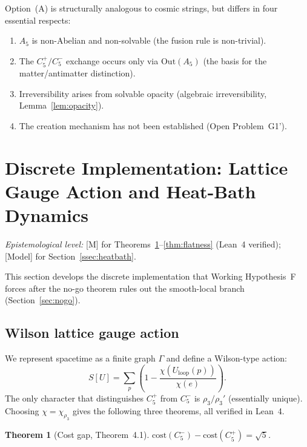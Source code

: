 \documentclass[sn-mathphys-num,Numbered]{sn-jnl}
\theoremstyle{thmstyleone}
\newtheorem{theorem}{Theorem}[section]
\theoremstyle{thmstylethree}
\theoremstyle{thmstyletwo}
\begin{document}
Option~(A) is structurally analogous to cosmic strings, but differs in
four essential respects:
\begin{enumerate}
  \item $A_5$ is non-Abelian and non-solvable (the fusion rule is
    non-trivial).
  \item The $C_5^+/C_5^-$ exchange occurs only via $\mathrm{Out}(A_5)$
    (the basis for the matter/antimatter distinction).
  \item Irreversibility arises from solvable opacity (algebraic
    irreversibility, Lemma~\ref{lem:opacity}).
  \item The creation mechanism has not been established (Open
    Problem~G1').
\end{enumerate}



\section{Discrete Implementation: Lattice Gauge Action and Heat-Bath Dynamics}
\label{sec:lattice}

\medskip
\noindent\textit{Epistemological level:} [M] for Theorems~\ref{thm:cost-gap}--\ref{thm:flatness} (Lean~4 verified); [Model] for Section~\ref{ssec:heatbath}.
\medskip

This section develops the discrete implementation that Working Hypothesis~F forces after the no-go
theorem rules out the smooth-local branch (Section~\ref{sec:nogo}).

\subsection{Wilson lattice gauge action}
\label{ssec:wilson}

We represent spacetime as a finite graph $\Gamma$ and define a
Wilson-type action:
\begin{equation}
  S[U] = \sum_{p} \left(1 - \frac{\chi(U_{\mathrm{loop}}(p))}{\chi(e)}\right).
  \label{eq:wilson}
\end{equation}
The only character that distinguishes $C_5^+$ from $C_5^-$ is
$\rho_3/\rho_3'$ (essentially unique).  Choosing $\chi = \chi_{\rho_3}$
gives the following three theorems, all verified in Lean~4.

\begin{theorem}[Cost gap, Theorem~4.1]
\label{thm:cost-gap}
$\mathrm{cost}(C_5^-) - \mathrm{cost}(C_5^+) = \sqrt{5}$.
\end{theorem}
\end{document}
